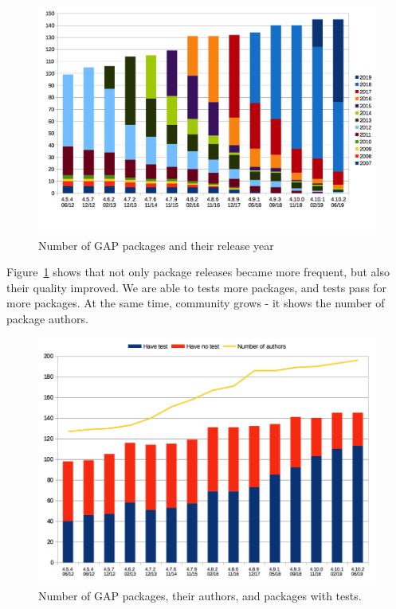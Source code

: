 \documentclass{deliverablereport}
\begin{document}
\begin{figure}[!ht]
    \centering
    \includegraphics[width=\textwidth]{images/gap-package-releases}
    \caption{Number of GAP packages and their release year}
    \label{fig:gap-package-releases}
\end{figure}

Figure~\ref{fig:gap-package-releases} shows that not only
package releases became more frequent, but also their quality
improved. We are able to tests more packages, and tests pass
for more packages. At the same time, community grows - it
shows the number of package authors.

\begin{figure}[!ht]
    \centering
    \includegraphics[width=\textwidth]{images/gap-package-tests}
    \caption{Number of GAP packages, their authors, and packages with tests.}
    \label{fig:gap-package-tests}
\end{figure}
\end{document}
